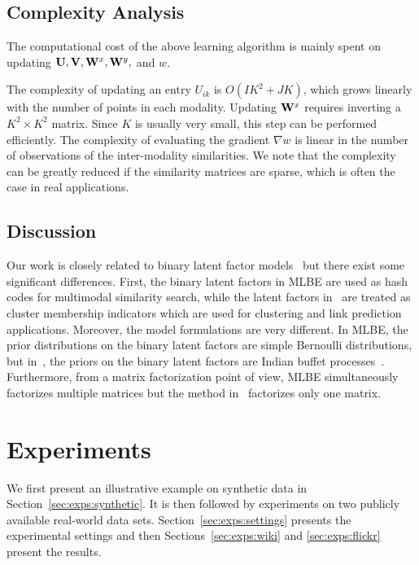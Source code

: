 \subsection{Complexity Analysis}

The computational cost of the above learning algorithm is mainly spent on updating ${\bf U} ,{\bf V} ,{\bf W}^{x}, {\bf W}^{y},$ and $w$.

The complexity of updating an entry $U_{ik}$ is $O(IK^{2}+JK)$, which grows linearly with the number of points in each modality. Updating ${\bf W}^{x}$ requires inverting a $K^2\times K^2$ matrix. Since $K$ is usually very small, this step can be performed efficiently. The complexity of evaluating the gradient $\nabla w$ is linear in the number of observations of the inter-modality similarities. We note that the complexity can be greatly reduced if the similarity matrices are sparse, which is often the case in real applications.

\subsection{Discussion}
\label{MH:exps:disc}
Our work is closely related to binary latent factor models~\cite{meeds2006nips,heller2007aistats} but there exist some significant differences.  First, the binary latent factors in MLBE are used as hash codes for multimodal similarity search, while the latent factors in~\cite{meeds2006nips,heller2007aistats} are treated as cluster membership indicators which are used for clustering and link prediction applications. Moreover, the model formulations are very different. In MLBE, the prior distributions on the binary latent factors are simple Bernoulli distributions, but in~\cite{meeds2006nips,heller2007aistats}, the priors on the binary latent factors are Indian buffet processes~\cite{griffiths2005nips}. Furthermore, from a matrix factorization point of view, MLBE simultaneously factorizes multiple matrices but the method in~\cite{meeds2006nips} factorizes only one matrix.

\section{Experiments}
\label{mlbe:exps}

We first present an illustrative example on synthetic data in Section~\ref{sec:exps:synthetic}.  It is then followed by experiments on two publicly available real-world data sets.  Section~\ref{sec:exps:settings} presents the experimental settings and then Sections~\ref{sec:exps:wiki} and \ref{sec:exps:flickr} present the results.

